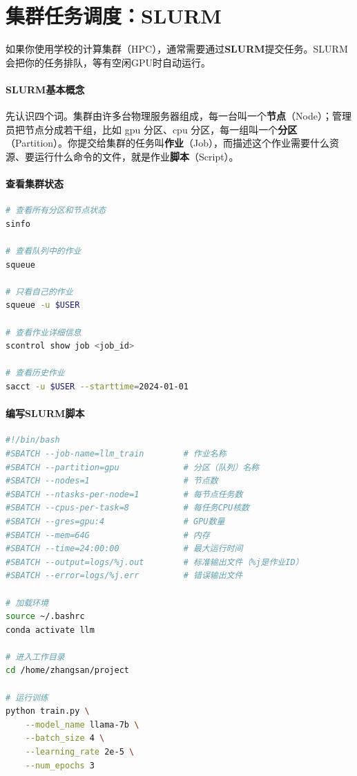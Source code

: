 \section*{集群任务调度：SLURM}

如果你使用学校的计算集群（HPC），通常需要通过\textbf{SLURM}提交任务。SLURM会把你的任务排队，等有空闲GPU时自动运行。

\paragraph{SLURM基本概念}

先认识四个词。集群由许多台物理服务器组成，每一台叫一个\textbf{节点}（Node）；管理员把节点分成若干组，比如 gpu 分区、cpu 分区，每一组叫一个\textbf{分区}（Partition）。你提交给集群的任务叫\textbf{作业}（Job），而描述这个作业需要什么资源、要运行什么命令的文件，就是作业\textbf{脚本}（Script）。

\paragraph{查看集群状态}\mbox{}\par\nopagebreak

\begin{lstlisting}[language=bash, caption=SLURM常用查询命令]
# 查看所有分区和节点状态
sinfo

# 查看队列中的作业
squeue

# 只看自己的作业
squeue -u $USER

# 查看作业详细信息
scontrol show job <job_id>

# 查看历史作业
sacct -u $USER --starttime=2024-01-01
\end{lstlisting}

\paragraph{编写SLURM脚本}\mbox{}\par\nopagebreak

\begin{lstlisting}[language=bash, caption=SLURM作业脚本示例（train.slurm）]
#!/bin/bash
#SBATCH --job-name=llm_train        # 作业名称
#SBATCH --partition=gpu             # 分区（队列）名称
#SBATCH --nodes=1                   # 节点数
#SBATCH --ntasks-per-node=1         # 每节点任务数
#SBATCH --cpus-per-task=8           # 每任务CPU核数
#SBATCH --gres=gpu:4                # GPU数量
#SBATCH --mem=64G                   # 内存
#SBATCH --time=24:00:00             # 最大运行时间
#SBATCH --output=logs/%j.out        # 标准输出文件（%j是作业ID）
#SBATCH --error=logs/%j.err         # 错误输出文件

# 加载环境
source ~/.bashrc
conda activate llm

# 进入工作目录
cd /home/zhangsan/project

# 运行训练
python train.py \
    --model_name llama-7b \
    --batch_size 4 \
    --learning_rate 2e-5 \
    --num_epochs 3
\end{lstlisting}

